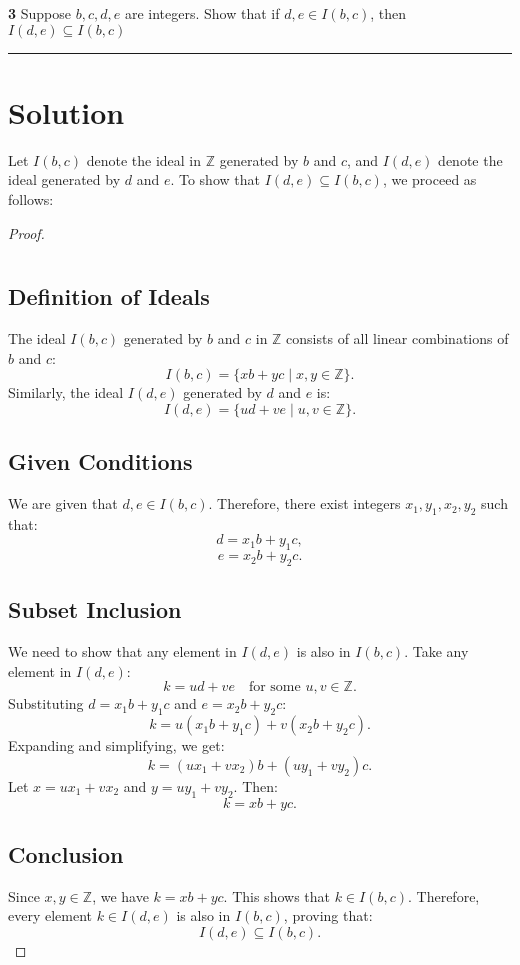 \documentclass[12pt]{amsart}
\theoremstyle{definition}
\numberwithin{equation}{section}
\begin{document}
\begin{exercise}{\textbf{3}} Suppose \(b,c,d,e\) are integers. Show that if \(d,e \in I(b,c)\), then \(I(d,e) \subseteq I(b,c)\)
    
    \noindent\rule{\linewidth}{1pt}

    \section*{Solution}

Let \(I(b,c)\) denote the ideal in \(\mathbb{Z}\) generated by \(b\) and \(c\), and \(I(d,e)\) denote the ideal generated by \(d\) and \(e\). To show that \(I(d,e) \subseteq I(b,c)\), we proceed as follows:

\begin{proof} \(\)
    \section*{}\vspace*{-20pt}
\subsection*{Definition of Ideals}
The ideal \(I(b,c)\) generated by \(b\) and \(c\) in \(\mathbb{Z}\) consists of all linear combinations of \(b\) and \(c\):
\[
I(b,c) = \{xb + yc \mid x, y \in \mathbb{Z}\}.
\]
Similarly, the ideal \(I(d,e)\) generated by \(d\) and \(e\) is:
\[
I(d,e) = \{ud + ve \mid u, v \in \mathbb{Z}\}.
\]

\subsection*{Given Conditions}
We are given that \(d, e \in I(b,c)\). Therefore, there exist integers \(x_1, y_1, x_2, y_2\) such that:
\[
d = x_1 b + y_1 c,
\]
\[
e = x_2 b + y_2 c.
\]

\subsection*{Subset Inclusion}
We need to show that any element in \(I(d,e)\) is also in \(I(b,c)\). Take any element in \(I(d,e)\):
\[
k = ud + ve \quad \text{for some } u, v \in \mathbb{Z}.
\]
Substituting \(d = x_1 b + y_1 c\) and \(e = x_2 b + y_2 c\):
\[
k = u(x_1 b + y_1 c) + v(x_2 b + y_2 c).
\]
Expanding and simplifying, we get:
\[
k = (ux_1 + vx_2)b + (uy_1 + vy_2)c.
\]
Let \(x = ux_1 + vx_2\) and \(y = uy_1 + vy_2\). Then:
\[
k = xb + yc.
\]

\subsection*{Conclusion}
Since \(x, y \in \mathbb{Z}\), we have \(k = xb + yc\). This shows that \(k \in I(b,c)\). Therefore, every element \(k \in I(d,e)\) is also in \(I(b,c)\), proving that:
\[
I(d,e) \subseteq I(b,c).
\]

\end{proof}
\end{exercise}
\end{document}
